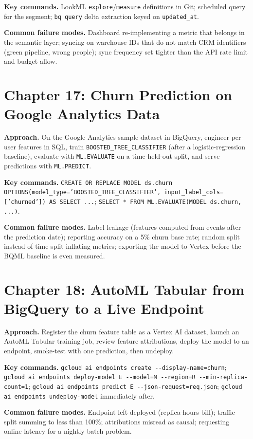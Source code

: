 \textbf{Key commands.} LookML \texttt{explore}/\texttt{measure} definitions in Git; scheduled query
for the segment; \texttt{bq query} delta extraction keyed on \texttt{updated\_at}.

\textbf{Common failure modes.} Dashboard re-implementing a metric that belongs in the semantic
layer; syncing on warehouse IDs that do not match CRM identifiers (green pipeline, wrong people);
sync frequency set tighter than the API rate limit and budget allow.

\section{Chapter 17: Churn Prediction on Google Analytics Data}
\textbf{Approach.} On the Google Analytics sample dataset in BigQuery, engineer per-user features
in SQL, train \texttt{BOOSTED\_TREE\_CLASSIFIER} (after a logistic-regression baseline), evaluate
with \texttt{ML.EVALUATE} on a time-held-out split, and serve predictions with
\texttt{ML.PREDICT}.

\textbf{Key commands.} \texttt{CREATE OR REPLACE MODEL ds.churn OPTIONS(model\_type='BOOSTED\_TREE\_CLASSIFIER',
input\_label\_cols=['churned']) AS SELECT ...}; \texttt{SELECT * FROM ML.EVALUATE(MODEL ds.churn, ...)}.

\textbf{Common failure modes.} Label leakage (features computed from events after the prediction
date); reporting accuracy on a 5\% churn base rate; random split instead of time split inflating
metrics; exporting the model to Vertex before the BQML baseline is even measured.

\section{Chapter 18: AutoML Tabular from BigQuery to a Live Endpoint}
\textbf{Approach.} Register the churn feature table as a Vertex AI dataset, launch an AutoML
Tabular training job, review feature attributions, deploy the model to an endpoint, smoke-test
with one prediction, then undeploy.

\textbf{Key commands.} \texttt{gcloud ai endpoints create -{}-display-name=churn};
\texttt{gcloud ai endpoints deploy-model E -{}-model=M -{}-region=R -{}-min-replica-count=1};
\texttt{gcloud ai endpoints predict E -{}-json-request=req.json}; \texttt{gcloud ai endpoints
undeploy-model} immediately after.

\textbf{Common failure modes.} Endpoint left deployed (replica-hours bill); traffic split summing
to less than 100\%; attributions misread as causal; requesting online latency for a nightly batch
problem.

